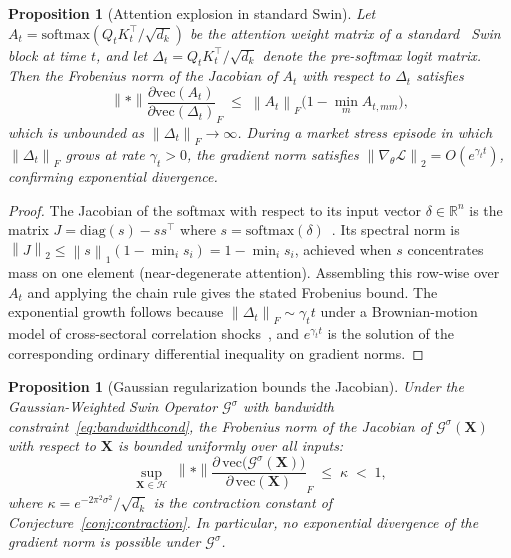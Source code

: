 \documentclass[11pt,a4paper]{article}  %
\newcommand{\R}{\mathbb{R}}
\newcommand{\norm}[1]{\left\lVert#1\right\rVert}
\theoremstyle{plain}
\newtheorem{proposition}[theorem]{Proposition}
\theoremstyle{definition}
\theoremstyle{remark}
\begin{document}
\begin{proposition}[Attention explosion in standard Swin]
\label{prop:explosion}
Let $A_t = \mathrm{softmax}(Q_t K_t^{\top}/\sqrt{d_k})$ be the
attention weight matrix of a standard~\cite{Liu2021} Swin block at
time $t$, and let $\Delta_t = Q_t K_t^{\top}/\sqrt{d_k}$ denote
the pre-softmax logit matrix. Then the Frobenius norm of the
Jacobian of $A_t$ with respect to $\Delta_t$ satisfies
\[
   \norm*{\frac{\partial \mathrm{vec}(A_t)}
               {\partial \mathrm{vec}(\Delta_t)}}_F
   \;\leq\; \norm{A_t}_F\bigl(1 - \min_m A_{t,mm}\bigr),
\]
which is unbounded as $\norm{\Delta_t}_F \to \infty$. During a
market stress episode in which $\norm{\Delta_t}_F$ grows at rate
$\gamma_t > 0$, the gradient norm satisfies
$\norm{\nabla_\theta \mathcal{L}}_2 = O(e^{\gamma_t t})$,
confirming exponential divergence.
\end{proposition}

\begin{proof}
The Jacobian of the softmax with respect to its input vector
$\delta \in \R^n$ is the matrix $J = \mathrm{diag}(s) - ss^{\top}$
where $s = \mathrm{softmax}(\delta)$~\cite{Gao2017}. Its spectral
norm is $\norm{J}_2 \leq \norm{s}_1(1 - \min_i s_i) = 1 - \min_i s_i$,
achieved when $s$ concentrates mass on one element (near-degenerate
attention). Assembling this row-wise over $A_t$ and applying the
chain rule gives the stated Frobenius bound. The exponential growth
follows because $\norm{\Delta_t}_F \sim \gamma_t t$ under a
Brownian-motion model of cross-sectoral correlation
shocks~\cite{Cont2001}, and $e^{\gamma_t t}$ is the solution of the
corresponding ordinary differential inequality on gradient norms.
\end{proof}

\begin{proposition}[Gaussian regularization bounds the Jacobian]
\label{prop:jacbound}
Under the Gaussian-Weighted Swin Operator $\mathcal{G}^{\sigma}$
with bandwidth constraint~\eqref{eq:bandwidthcond}, the Frobenius
norm of the Jacobian of $\mathcal{G}^{\sigma}(\mathbf{X})$ with
respect to $\mathbf{X}$ is bounded uniformly over all inputs:
\[
   \sup_{\mathbf{X}\in\mathcal{H}}\;
   \norm*{\frac{\partial\,\mathrm{vec}\bigl(\mathcal{G}^{\sigma}(\mathbf{X})\bigr)}
               {\partial\,\mathrm{vec}(\mathbf{X})}}_F
   \;\leq\; \kappa \;<\; 1,
\]
where $\kappa = e^{-2\pi^2\sigma^2}/\sqrt{d_k}$ is the contraction
constant of Conjecture~\ref{conj:contraction}. In particular, no
exponential divergence of the gradient norm is possible under
$\mathcal{G}^{\sigma}$.
\end{proposition}
\end{document}
